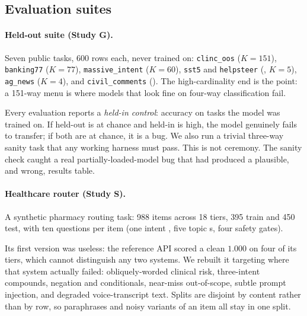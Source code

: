 \subsection{Evaluation suites}

\paragraph{Held-out suite (Study G).} Seven public tasks, 600 rows each,
never trained on: \texttt{clinc\_oos} ($K{=}151$), \texttt{banking77}
($K{=}77$), \texttt{massive\_intent} ($K{=}60$), \texttt{sst5} and
\texttt{helpsteer} (\score{}, $K{=}5$), \texttt{ag\_news} ($K{=}4$), and
\texttt{civil\_comments} (\noul{}). The high-cardinality end is the point:
a 151-way menu is where models that look fine on four-way classification
fail.

Every evaluation reports a \emph{held-in control}: accuracy on tasks the
model was trained on. If held-out is at chance and held-in is high, the
model genuinely fails to transfer; if both are at chance, it is a bug. We
also run a trivial three-way sanity task that any working harness must
pass. This is not ceremony. The sanity check caught a real
partially-loaded-model bug that had produced a plausible, and wrong,
results table.

\paragraph{Healthcare router (Study S).} A synthetic pharmacy routing task:
988 items across 18 tiers, 395 train and 450 test, with ten questions per
item (one intent \choice{}, five topic \noul{}s, four safety gates).

Its first version was useless: the reference API scored a clean $1.000$ on
four of its tiers, which cannot distinguish any two systems. We rebuilt it
targeting where that system actually failed: obliquely-worded clinical
risk, three-intent compounds, negation and conditionals, near-miss
out-of-scope, subtle prompt injection, and degraded voice-transcript text.
Splits are disjoint by content rather than by row, so paraphrases and
noisy variants of an item all stay in one split.
